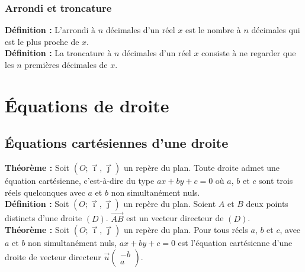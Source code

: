 \documentclass[a4paper,titlepage]{article}
\let\oldsection\section
\renewcommand\section{\clearpage\oldsection}
\begin{document}
        \subsubsection{Arrondi et troncature}
            \textbf{Définition :} L’arrondi à $n$ décimales d’un réel $x$ est le nombre à $n$ décimales qui est le plus proche de $x$.
            \\
            \textbf{Définition :} La troncature à $n$ décimales d’un réel $x$ consiste à ne regarder que les $n$ premières décimales de $x$.
\section{Équations de droite}
    \subsection{Équations cartésiennes d’une droite}
        \textbf{Théorème :} Soit $\left(O;\vec{\imath},\vec{\jmath}\right)$ un repère du plan. Toute droite admet une équation cartésienne, c’est-à-dire du type $ax+by+c=0$ où $a$, $b$ et $c$ sont trois réels quelconques avec $a$ et $b$ non simultanément nuls.
        \\
        \textbf{Définition :} Soit $\left(O;\vec{\imath},\vec{\jmath}\right)$ un repère du plan. Soient $A$ et $B$ deux points distincts d’une droite $\left(D\right)$. $\overrightarrow{AB}$ est un vecteur directeur de $\left(D\right)$.
        \\
        \textbf{Théorème :} Soit $\left(O;\vec{\imath},\vec{\jmath}\right)$ un repère du plan. Pour tous réels $a$, $b$ et $c$, avec $a$ et $b$ non simultanément nuls, $ax+by+c=0$ est l’équation cartésienne d’une droite de vecteur directeur $\vec{u}\left(\begin{smallmatrix}-b\\a\end{smallmatrix}\right)$.
\end{document}
